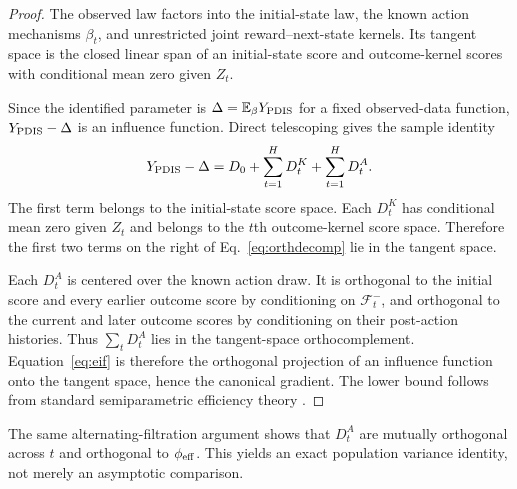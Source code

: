 \begin{proof}
The observed law factors into the initial-state law, the known action mechanisms $\beta_t$, and unrestricted joint reward--next-state kernels. Its tangent space is the closed linear span of an initial-state score and outcome-kernel scores with conditional mean zero given $Z_t$.

Since the identified parameter is $\Delta=\mathbb{E}_\beta Y_{\rm PDIS}$ for a fixed observed-data function, $Y_{\rm PDIS}-\Delta$ is an influence function. Direct telescoping gives the sample identity
\begin{equation}
Y_{\rm PDIS}-\Delta
=D_0+\sum_{t=1}^H D_t^K+
\sum_{t=1}^H D_t^A.
\label{eq:orthdecomp}
\end{equation}
The first term belongs to the initial-state score space. Each $D_t^K$ has conditional mean zero given $Z_t$ and belongs to the $t$th outcome-kernel score space. Therefore the first two terms on the right of Eq.~\eqref{eq:orthdecomp} lie in the tangent space.

Each $D_t^A$ is centered over the known action draw. It is orthogonal to the initial score and every earlier outcome score by conditioning on $\mathcal F_t^-$, and orthogonal to the current and later outcome scores by conditioning on their post-action histories. Thus $\sum_tD_t^A$ lies in the tangent-space orthocomplement. Equation~\eqref{eq:eif} is therefore the orthogonal projection of an influence function onto the tangent space, hence the canonical gradient. The lower bound follows from standard semiparametric efficiency theory \citep{bickel1993efficient}.
\end{proof}

The same alternating-filtration argument shows that $D_t^A$ are mutually orthogonal across $t$ and orthogonal to $\phi_{\rm eff}$. This yields an exact population variance identity, not merely an asymptotic comparison.

